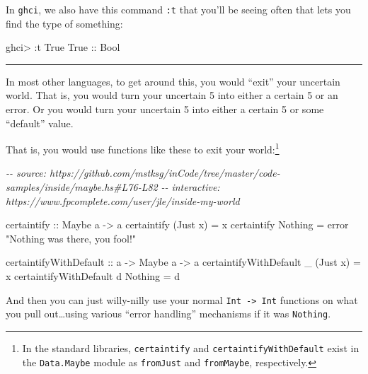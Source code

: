 \documentclass[]{article}
\newenvironment{Shaded}{}{}
\newcommand{\CommentTok}[1]{\textcolor[rgb]{0.38,0.63,0.69}{\textit{#1}}}
\newcommand{\DataTypeTok}[1]{\textcolor[rgb]{0.56,0.13,0.00}{#1}}
\newcommand{\FunctionTok}[1]{\textcolor[rgb]{0.02,0.16,0.49}{#1}}
\newcommand{\NormalTok}[1]{#1}
\newcommand{\OperatorTok}[1]{\textcolor[rgb]{0.40,0.40,0.40}{#1}}
\newcommand{\OtherTok}[1]{\textcolor[rgb]{0.00,0.44,0.13}{#1}}
\newcommand{\StringTok}[1]{\textcolor[rgb]{0.25,0.44,0.63}{#1}}
\begin{document}
In \texttt{ghci}, we also have this command \texttt{:t} that you'll be seeing
often that lets you find the type of something:

\begin{Shaded}
\begin{Highlighting}[]
\NormalTok{ghci}\OperatorTok{\textgreater{}} \OperatorTok{:}\NormalTok{t }\DataTypeTok{True}
\DataTypeTok{True}\OtherTok{ ::} \DataTypeTok{Bool}
\end{Highlighting}
\end{Shaded}

\begin{center}\rule{0.5\linewidth}{0.5pt}\end{center}

In most other languages, to get around this, you would ``exit'' your uncertain
world. That is, you would turn your uncertain 5 into either a certain 5 or an
error. Or you would turn your uncertain 5 into either a certain 5 or some
``default'' value.

That is, you would use functions like these to exit your world:\footnote{In the
  standard libraries, \texttt{certaintify} and \texttt{certaintifyWithDefault}
  exist in the \texttt{Data.Maybe} module as \texttt{fromJust} and
  \texttt{fromMaybe}, respectively.}

\begin{Shaded}
\begin{Highlighting}[]
\CommentTok{{-}{-} source: https://github.com/mstksg/inCode/tree/master/code{-}samples/inside/maybe.hs\#L76{-}L82}
\CommentTok{{-}{-} interactive: https://www.fpcomplete.com/user/jle/inside{-}my{-}world}

\OtherTok{certaintify ::} \DataTypeTok{Maybe}\NormalTok{ a }\OtherTok{{-}\textgreater{}}\NormalTok{ a}
\NormalTok{certaintify (}\DataTypeTok{Just}\NormalTok{ x) }\OtherTok{=}\NormalTok{ x}
\NormalTok{certaintify }\DataTypeTok{Nothing}  \OtherTok{=} \FunctionTok{error} \StringTok{"Nothing was there, you fool!"}

\OtherTok{certaintifyWithDefault ::}\NormalTok{ a }\OtherTok{{-}\textgreater{}} \DataTypeTok{Maybe}\NormalTok{ a }\OtherTok{{-}\textgreater{}}\NormalTok{ a}
\NormalTok{certaintifyWithDefault \_ (}\DataTypeTok{Just}\NormalTok{ x) }\OtherTok{=}\NormalTok{ x}
\NormalTok{certaintifyWithDefault d }\DataTypeTok{Nothing}  \OtherTok{=}\NormalTok{ d}
\end{Highlighting}
\end{Shaded}

And then you can just willy-nilly use your normal
\texttt{Int\ -\textgreater{}\ Int} functions on what you pull out\ldots using
various ``error handling'' mechanisms if it was \texttt{Nothing}.
\end{document}
